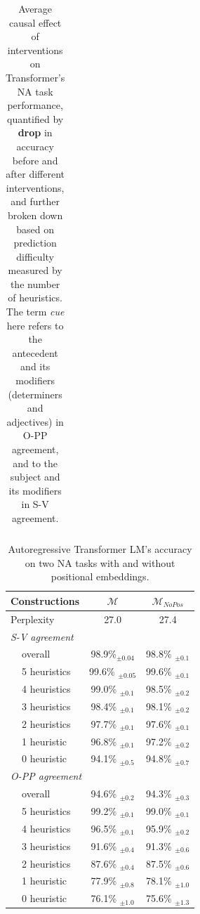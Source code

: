 \begin{table}[ht]
{\begin{tabular}{lcccc}
    
    \bottomrule
  \end{tabular}}
  \caption{Average causal effect of interventions on Transformer's NA task performance, quantified by \textbf{drop} in accuracy before and after different interventions, and further broken down based on prediction difficulty measured by the number of heuristics. The term \emph{cue} here refers to the antecedent and its modifiers (determiners and adjectives) in O-PP agreement, and to the subject and its modifiers in S-V agreement.}
    \label{tab:full_causal_res}
\end{table}

\begin{table}[ht]
  \centering
  \begin{tabular}{llcc}
    \toprule
    \multicolumn{2}{l}{Constructions}  &$\mathcal{M}$ & $\mathcal{M}_{NoPos}$ \\
    \midrule
    \multicolumn{2}{l}{Perplexity}   & 27.0   & 27.4   \\
    \midrule
    \multicolumn{4}{l}{\textit{S-V agreement}} \\
    \phantom{ab} & overall  & 98.9\%$_{\pm 0.04}$   & 98.8\% $_{\pm 0.1}$ \\\cline{2-4}
    \phantom{ab} & 5 heuristics  &99.6\% $_{\pm 0.05}$ & 99.6\% $_{\pm 0.1}$ \\
    \phantom{ab} & 4 heuristics  &99.0\% $_{\pm 0.1}$ & 98.5\% $_{\pm 0.2}$ \\
    \phantom{ab} & 3 heuristics  & 98.4\% $_{\pm 0.1}$ & 98.1\% $_{\pm 0.2}$\\
    \phantom{ab} & 2 heuristics  & 97.7\% $_{\pm 0.1}$& 97.6\% $_{\pm 0.1}$\\    
    \phantom{ab} & 1 heuristic &96.8\% $_{\pm 0.1}$& 97.2\% $_{\pm 0.2}$\\
    \phantom{ab} & 0 heuristic &94.1\% $_{\pm 0.5}$ & 94.8\% $_{\pm 0.7}$\\
    \midrule
    \multicolumn{4}{l}{\textit{O-PP agreement}} \\
     & overall  & 94.6\% $_{\pm 0.2}$  & 94.3\% $_{\pm 0.3}$     \\\cline{2-4}
      & 5 heuristics  &99.2\% $_{\pm 0.1}$ & 99.0\% $_{\pm 0.1}$ \\
     & 4 heuristics  &96.5\% $_{\pm 0.1}$ & 95.9\% $_{\pm 0.2}$\\
     & 3 heuristics  & 91.6\% $_{\pm 0.4}$& 91.3\% $_{\pm 0.6}$\\
     & 2 heuristics  & 87.6\% $_{\pm 0.4}$& 87.5\% $_{\pm 0.6}$\\    
     & 1 heuristic &77.9\% $_{\pm 0.8}$& 78.1\%  $_{\pm 1.0}$ \\
     & 0 heuristic  &76.1\% $_{\pm 1.0}$& 75.6\% $_{\pm 1.3}$\\
    \bottomrule
  \end{tabular}
\caption{Autoregressive Transformer LM's accuracy on two NA tasks with and without positional embeddings. \label{tab:TM_nopos}
}
\end{table}

